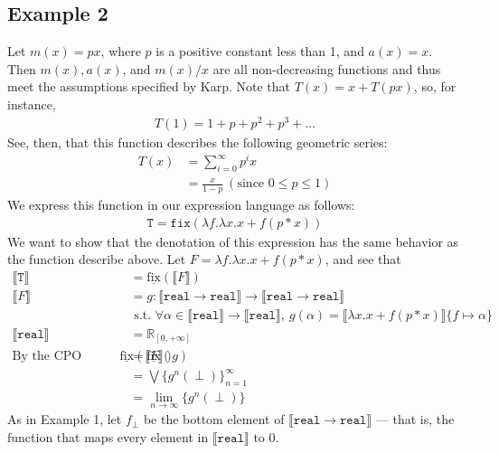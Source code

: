 \documentclass{westhesis}
\newcommand{\R}{\mathbb{R}}
\begin{document}
\subsection{Example 2}
Let $m(x) = px$, where $p$ is a positive constant less than 1, and $a(x) = x$. Then $m(x), a(x)$, and $m(x)/x$ are all non-decreasing functions and thus meet the assumptions specified by Karp. Note that $T(x) = x + T(px)$, so, for instance,
\begin{align*}
T(1) = 1 + p + p^2 + p^3 + \ldots
\end{align*}
See, then, that this function describes the following geometric series:
\begin{align*}
T(x) &= \sum_{i=0}^{\infty} p^ix \\ 
&= \frac{x}{1 - p} \ (\text{since } 0 \leq p \leq 1)
\end{align*}
We express this function in our expression language as follows:
\begin{align*}
 \texttt{T} = \texttt{fix}(\lambda f. \lambda x.x + f (p * x))
 \end{align*}
We want to show that the denotation of this expression has the same behavior as the function describe above. Let $F = \lambda f. \lambda x.x + f (p * x)$, and see that 
 \begin{align*}
 \llbracket \texttt{T} \rrbracket &= \underline{\text{fix}}(\llbracket F \rrbracket) \\
 \llbracket F \rrbracket &= g : \llbracket \texttt{real} \rightarrow \texttt{real}\rrbracket \rightarrow \llbracket \texttt{real} \rightarrow \texttt{real}\rrbracket \\ &\text{ \ \ \ s.t. } \forall \alpha \in \llbracket \texttt{real}\rrbracket \rightarrow \llbracket \texttt{real}\rrbracket, \ 
 g(\alpha) = \llbracket \lambda x.x + f (p * x)\rrbracket\{f \mapsto \alpha\} \\
 \llbracket \texttt{real}\rrbracket &= \R_{[0, +\infty]}  
 \\\text{By the CPO fixpoint theorem, } \underline{\text{fix}}(\llbracket F \rrbracket) &= \underline{\text{fix}}(g) \\
&= \bigvee\{g^n (\perp)\}^{\infty}_{n=1} \\
&= \lim_{n \to \infty}\{g^n (\perp)\}
 \end{align*}
As in Example 1, let $f_{\perp}$ be the bottom element of $\llbracket \texttt{real} \rightarrow \texttt{real} \rrbracket$ --- that is, 
the function that maps every element in $\llbracket \texttt{real} \rrbracket$ to $0$. 
\end{document}
